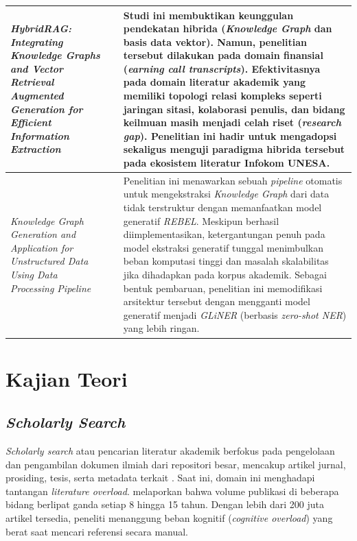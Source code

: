 \begin{longtable}{|>{\raggedright\arraybackslash}p{}|>{\centering\arraybackslash}p{}|>{\raggedright\arraybackslash}p{}|}
    \textit{HybridRAG: Integrating Knowledge Graphs and Vector Retrieval Augmented Generation for Efficient Information Extraction} &
    \cite{10.1145/3677052.3698671}                                                                                                  &
    Studi ini membuktikan keunggulan pendekatan hibrida (\textit{Knowledge Graph} dan basis data vektor). Namun, penelitian tersebut dilakukan pada domain finansial (\textit{earning call transcripts}). Efektivitasnya pada domain literatur akademik yang memiliki topologi relasi kompleks seperti jaringan sitasi, kolaborasi penulis, dan bidang keilmuan masih menjadi celah riset (\textit{research gap}). Penelitian ini hadir untuk mengadopsi sekaligus menguji paradigma hibrida tersebut pada ekosistem literatur Infokom UNESA.
    \\ \hline

    \textit{Knowledge Graph Generation and Application for Unstructured Data Using Data Processing Pipeline}                        &
    \cite{thushara2024}                                                                                                             &
    Penelitian ini menawarkan sebuah \textit{pipeline} otomatis untuk mengekstraksi \textit{Knowledge Graph} dari data tidak terstruktur dengan memanfaatkan model generatif \textit{REBEL}. Meskipun berhasil diimplementasikan, ketergantungan penuh pada model ekstraksi generatif tunggal menimbulkan beban komputasi tinggi dan masalah skalabilitas jika dihadapkan pada korpus akademik. Sebagai bentuk pembaruan, penelitian ini memodifikasi arsitektur tersebut dengan mengganti model generatif menjadi \textit{GLiNER} (berbasis \textit{zero-shot NER}) yang lebih ringan.
    \\ \hline
\end{longtable}
\endgroup

\section{Kajian Teori}

\subsection{\textit{Scholarly Search}}

\textit{Scholarly search} atau pencarian literatur akademik berfokus pada pengelolaan dan pengambilan dokumen ilmiah dari repositori besar, mencakup artikel jurnal, prosiding, tesis, serta metadata terkait \citep{Kasela_2025}. Saat ini, domain ini menghadapi tantangan \textit{literature overload}. \citet{Larsen2010} melaporkan bahwa volume publikasi di beberapa bidang berlipat ganda setiap 8 hingga 15 tahun. Dengan lebih dari 200 juta artikel tersedia, peneliti menanggung beban kognitif (\textit{cognitive overload}) yang berat saat mencari referensi secara manual.

